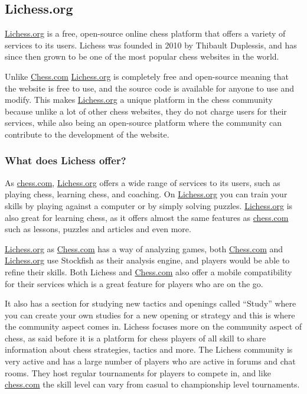 \subsection{Lichess.org}\label{subsec:lichess-org}

\url{Lichess.org} is a free, open-source online chess platform that offers a variety of services to its users.
Lichess was founded in 2010 by Thibault Duplessis, and has since then grown to be one of the most popular chess websites
in the world.

Unlike \url{Chess.com} \url{Lichess.org} is completely free and open-source meaning that the website is free to use,
and the source
code is available for anyone to use and modify.
This makes \url{Lichess.org} a unique platform in the chess community because unlike a lot of other chess websites,
they do not charge users for their services, while also being an open-source platform where the community can contribute
to the development of the website.

\subsubsection{What does Lichess offer?}\label{subsubsec:what-does-lichess-offer}

As \url{chess.com}, \url{Lichess.org} offers a wide range of services to its users, such as playing chess,
learning chess, and coaching.
On \url{Lichess.org} you can train your skills by playing against a computer or by simply solving puzzles.
\url{Lichess.org} is also great for learning chess, as it offers almost the same features as \url{chess.com}
such as lessons, puzzles and articles and even more.

\url{Lichess.org} as \url{Chess.com} has a way of analyzing games, both \url{Chess.com} and \url{Lichess.org} use Stockfish
as their analysis
engine, and players would be able to refine their skills.
Both Lichess and \url{Chess.com} also offer a mobile compatibility for their services which is a great feature for players
who are on the go.

It also has a section for studying new tactics and openings called “Study” where you can create your own studies for
a new opening or strategy and this is where the community aspect comes in.
Lichess focuses more on the community aspect of chess, as said before it is a platform for chess players of all skill
to share information about chess strategies, tactics and more.
The Lichess community is very active and has a large number of players who are active in forums and chat rooms.
They host regular tournaments for players to compete in, and like \url{chess.com} the skill level can vary
from casual to championship level tournaments.
